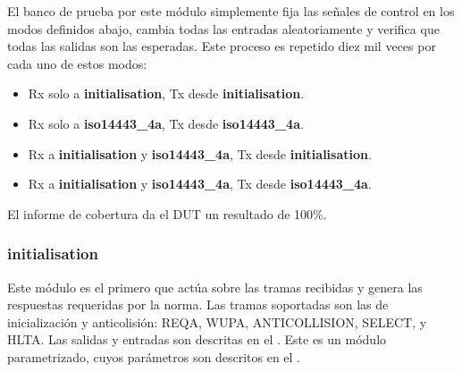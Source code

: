 \documentclass[a4paper, twoside, 11pt]{report}
\begin{document}
El banco de prueba por este módulo simplemente fija las señales de control en los modos definidos abajo, cambia todas las entradas aleatoriamente y verifica que todas las salidas son las esperadas. Este proceso es repetido diez mil veces por cada uno de estos modos:

\begin{itemize}
  \item Rx solo a \textbf{initialisation}, Tx desde \textbf{initialisation}.
  \item Rx solo a \textbf{iso14443\_4a}, Tx desde \textbf{iso14443\_4a}.
  \item Rx a \textbf{initialisation} y \textbf{iso14443\_4a}, Tx desde \textbf{initialisation}.
  \item Rx a \textbf{initialisation} y \textbf{iso14443\_4a}, Tx desde \textbf{iso14443\_4a}.
\end{itemize}

El informe de cobertura da el DUT un resultado de 100\%.

\FloatBarrier
\subsubsection{initialisation}
\label{sec:initialisation}

Este módulo es el primero que actúa sobre las tramas recibidas y genera las respuestas requeridas por la norma. Las tramas soportadas son las de inicialización y anticolisión: REQA, WUPA, ANTICOLLISION, SELECT, y HLTA. Las salidas y entradas son descritas en el . Este es un módulo parametrizado, cuyos parámetros son descritos en el .
\end{document}

